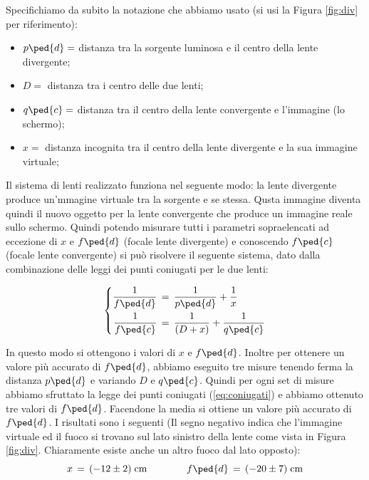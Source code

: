 Specifichiamo da subito la notazione che abbiamo usato (si usi la Figura \ref{fig:div} per riferimento):
\begin{itemize}
	\item{$p\ped{d} = $ distanza tra la sorgente luminosa e il centro della lente divergente;}
	\item{$D = $ distanza tra i centro delle due lenti;}
    \item{$q\ped{c} = $ distanza tra il centro della lente convergente e l'immagine (lo schermo);}
	\item{$x = $ distanza incognita tra il centro della lente divergente e la sua immagine virtuale;}
\end{itemize}

Il sistema di lenti realizzato funziona nel seguente modo: la lente divergente produce un'mmagine virtuale tra la sorgente e se stessa. Qusta immagine diventa quindi il nuovo oggetto per la lente convergente che produce un immagine reale sullo schermo. Quindi potendo misurare tutti i parametri sopraelencati ad eccezione di $x$ e $f\ped{d}$ (focale lente divergente) e conoscendo $f\ped{c}$ (focale lente convergente) si può risolvere il seguente sistema, dato dalla combinazione delle leggi dei punti coniugati per le due lenti:

\begin{equation}
 \left\{
  \begin{aligned}
    \frac{1}{f\ped{d}} & \,=\, \frac{1}{p\ped{d}} + \frac{1}{x}\\
    \frac{1}{f\ped{c}} & \,=\, \frac{1}{(D + x)} + \frac{1}{q\ped{c}}
  \end{aligned}
\right.
\end{equation}

In questo modo si ottengono i valori di $x$ e $f\ped{d}$. Inoltre per ottenere un valore più accurato di $f\ped{d}$, abbiamo eseguito tre misure tenendo ferma la distanza $p\ped{d}$ e variando $D$ e $q\ped{c}$. Quindi per ogni set di misure abbiamo sfruttato la legge dei punti coniugati (\ref{eq:coniugati}) e abbiamo ottenuto tre valori di $f\ped{d}$. Facendone la media si ottiene un valore più accurato di $f\ped{d}$. I risultati sono i seguenti (Il segno negativo indica che l'immagine virtuale ed il fuoco si trovano sul lato sinistro della lente come vista in Figura \ref{fig:div}. Chiaramente esiste anche un altro fuoco dal lato opposto):
\begin{equation}
	x \,=\, (-12 \pm 2) \;\si{\centi\metre} \qquad \qquad f\ped{d} \,=\, (-20 \pm 7) \;\si{\centi\metre}
\end{equation}

